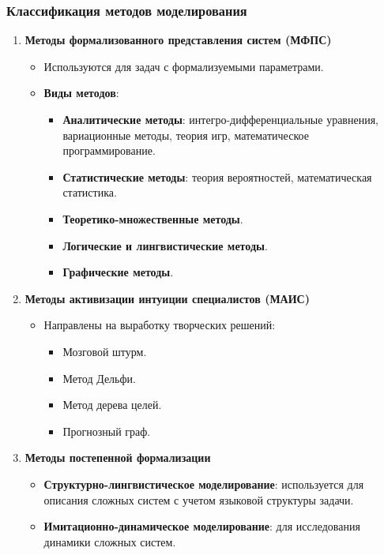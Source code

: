 \documentclass[
]{article}
\providecommand{\tightlist}{%
  \setlength{\itemsep}{0pt}\setlength{\parskip}{0pt}}
\begin{document}
\subsubsection{\texorpdfstring{\textbf{Классификация методов
моделирования}}{Классификация методов моделирования}}\label{ux43aux43bux430ux441ux441ux438ux444ux438ux43aux430ux446ux438ux44f-ux43cux435ux442ux43eux434ux43eux432-ux43cux43eux434ux435ux43bux438ux440ux43eux432ux430ux43dux438ux44f}

\begin{enumerate}
\def\labelenumi{\arabic{enumi}.}
\item
  \textbf{Методы формализованного представления систем (МФПС)}

  \begin{itemize}
  \tightlist
  \item
    Используются для задач с формализуемыми параметрами.
  \item
    \textbf{Виды методов}:

    \begin{itemize}
    \tightlist
    \item
      \textbf{Аналитические методы}: интегро-дифференциальные уравнения,
      вариационные методы, теория игр, математическое программирование.
    \item
      \textbf{Статистические методы}: теория вероятностей,
      математическая статистика.
    \item
      \textbf{Теоретико-множественные методы}.
    \item
      \textbf{Логические и лингвистические методы}.
    \item
      \textbf{Графические методы}.
    \end{itemize}
  \end{itemize}
\item
  \textbf{Методы активизации интуиции специалистов (МАИС)}

  \begin{itemize}
  \tightlist
  \item
    Направлены на выработку творческих решений:

    \begin{itemize}
    \tightlist
    \item
      Мозговой штурм.
    \item
      Метод Дельфи.
    \item
      Метод дерева целей.
    \item
      Прогнозный граф.
    \end{itemize}
  \end{itemize}
\item
  \textbf{Методы постепенной формализации}

  \begin{itemize}
  \tightlist
  \item
    \textbf{Структурно-лингвистическое моделирование}: используется для
    описания сложных систем с учетом языковой структуры задачи.
  \item
    \textbf{Имитационно-динамическое моделирование}: для исследования
    динамики сложных систем.
  \end{itemize}
\end{enumerate}
\end{document}
